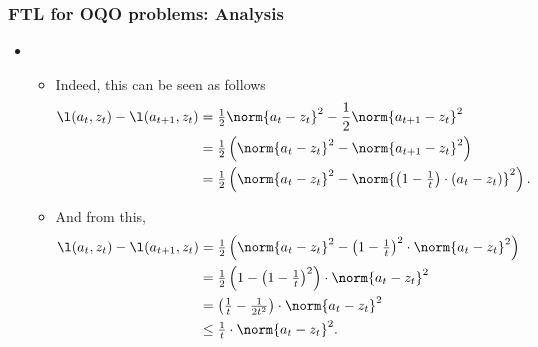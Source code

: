 \documentclass[11pt,compress,t,notes=noshow, xcolor=table]{beamer}
\begin{document}
\begin{frame} 
	\frametitle{FTL for OQO problems: Analysis}
	
	
	\small
	\begin{itemize}	
		\item[]
		\begin{itemize}	 
				\item Indeed, this can be seen as follows
				{\footnotesize
						\begin{align*}
								\l(a_t,z_t) - \l(a_{t+1},z_t) 
								&= \tfrac{1}{2}\norm{a_t - z_t}^2 - \frac{1}{2}\norm{a_{t+1} - z_{t}}^2 \\
								 &= \tfrac{1}{2} \left( \norm{a_t - z_t}^2 - \norm{a_{t+1} - z_{t}}^2 \right) \\
								 &= \tfrac{1}{2} \left( \norm{a_t - z_t}^2  - \norm{\left(1 - \tfrac{1}{t} \right) \cdot (a_t - z_t)}^2 \right).
							\end{align*}	
					}
				\pause 
				\item And from this,
								{\footnotesize
					\begin{align*}
						\l(a_t,z_t) - \l(a_{t+1},z_t) 
						&= \tfrac{1}{2} \left( \norm{a_t - z_t}^2  - \left(1 - \tfrac{1}{t} \right)^2 \cdot \norm{a_t - z_t}^2 \right) \\
						&= \tfrac{1}{2} \left(1 - \left(1 - \tfrac{1}{t} \right)^2 \right) \cdot \norm{a_t - z_t}^2 \\
						&= \left(\tfrac{1}{t} - \tfrac{1}{2t^2}\right) \cdot \norm{a_t - z_t}^2 \\
						&\leq \tfrac{1}{t} \cdot \norm{a_t - z_t}^2.
					\end{align*}	
				}
				
			\end{itemize}
	\end{itemize}
\end{frame}
\end{document}
